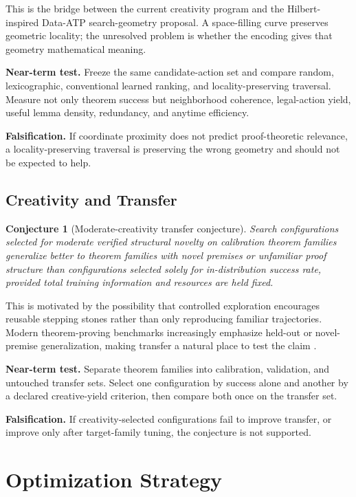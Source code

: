 \documentclass[11pt]{article}
\theoremstyle{datatheorem}
\newtheorem{conjecture}{Conjecture}[section]
\theoremstyle{definition}
\begin{document}
This is the bridge between the current creativity program and the Hilbert-inspired Data-ATP search-geometry proposal. A space-filling curve preserves geometric locality; the unresolved problem is whether the encoding gives that geometry mathematical meaning.

\textbf{Near-term test.} Freeze the same candidate-action set and compare random, lexicographic, conventional learned ranking, and locality-preserving traversal. Measure not only theorem success but neighborhood coherence, legal-action yield, useful lemma density, redundancy, and anytime efficiency.

\textbf{Falsification.} If coordinate proximity does not predict proof-theoretic relevance, a locality-preserving traversal is preserving the wrong geometry and should not be expected to help.

\clearpage
\subsection{Creativity and Transfer}

\begin{conjecture}[Moderate-creativity transfer conjecture]\label{conj:transfer}
Search configurations selected for moderate verified structural novelty on calibration theorem families generalize better to theorem families with novel premises or unfamiliar proof structure than configurations selected solely for in-distribution success rate, provided total training information and resources are held fixed.
\end{conjecture}

This is motivated by the possibility that controlled exploration encourages reusable stepping stones rather than only reproducing familiar trajectories. Modern theorem-proving benchmarks increasingly emphasize held-out or novel-premise generalization, making transfer a natural place to test the claim \cite{yang2023,bansal2019}.

\textbf{Near-term test.} Separate theorem families into calibration, validation, and untouched transfer sets. Select one configuration by success alone and another by a declared creative-yield criterion, then compare both once on the transfer set.

\textbf{Falsification.} If creativity-selected configurations fail to improve transfer, or improve only after target-family tuning, the conjecture is not supported.

\section{Optimization Strategy}
\end{document}

